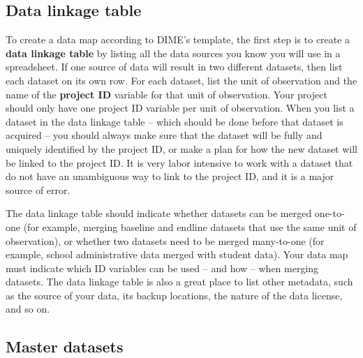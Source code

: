 \subsection{Data linkage table}

To create a data map according to DIME's template,
the first step is to create a \textbf{data linkage table} by listing
all the data sources you know you will use in a spreadsheet.
If one source of data will result in two different datasets,
then list each dataset on its own row.
For each dataset, list the unit of observation
and the name of the \textbf{project ID}
variable for that unit of observation.
Your project should only have one project ID variable per unit of observation.
When you list a dataset in the data linkage table --
which should be done before that dataset is acquired --
you should always make sure that the dataset will
be fully and uniquely identified by the project ID,
or make a plan for how
the new dataset will be linked to the project ID.
It is very labor intensive to work with a dataset that
do not have an unambiguous way to link to the project ID,
and it is a major source of error.

The data linkage table should indicate whether
datasets can be merged one-to-one (for example,
merging baseline and endline datasets
that use the same unit of observation),
or whether two datasets need to be merged many-to-one
(for example, school administrative data merged with student data).
Your data map must indicate which ID variables
can be used -- and how -- when merging datasets.
The data linkage table is also a great place to list other metadata,
such as the source of your data, its backup locations,
the nature of the data license, and so on.

\subsection{Master datasets}

